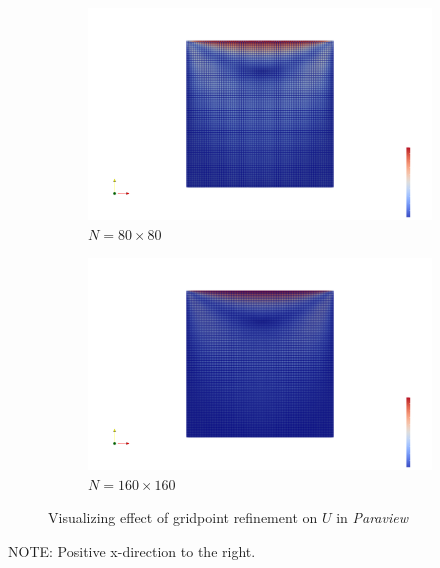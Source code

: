\documentclass[11pt]{article}
\begin{document}
\begin{figure}[H]
   \begin{subfigure}{0.495\linewidth}
      \includegraphics[width=\linewidth]{images/paraview_U_80.png}
      \caption{$N = 80 \times 80$}
   \end{subfigure}
   \begin{subfigure}{0.495\linewidth}
      \includegraphics[width=\linewidth]{images/paraview_U_160.png}
      \caption{$N = 160 \times 160$}
   \end{subfigure}
   \caption{Visualizing effect of gridpoint refinement on $U$ in \textit{Paraview}}
   \label{paraviewrefine}
\end{figure}

NOTE: Positive x-direction to the right.
   
\end{document}
